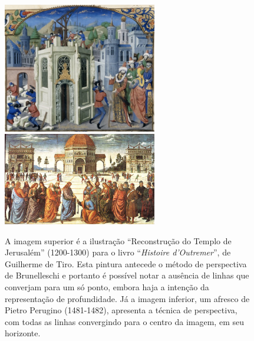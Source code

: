 \begin{figure}[h!]
  \begin{center}
    \includegraphics[width=0.6\textwidth]{figs/perspectiva1.png} \\
    \vspace{1cm}
    \includegraphics[width=0.6\textwidth]{figs/perspectiva2.png}
      \caption{A imagem superior é a ilustração ``Reconstrução do
        Templo de Jerusalém'' (1200-1300) para o livro
        ``\textit{Histoire d'Outremer}'', de Guilherme de Tiro. Esta
        pintura antecede o método de perspectiva de Brunelleschi e
        portanto é possível notar a ausência de linhas que converjam
        para um só ponto, embora haja a intenção da representação de
        profundidade. Já a imagem inferior, um afresco de Pietro
        Perugino (1481-1482), apresenta a técnica de perspectiva, com
        todas as linhas convergindo para o centro da imagem, em seu
        horizonte.}
      \label{fig:perspectiva}
\end{center}
\end{figure}

